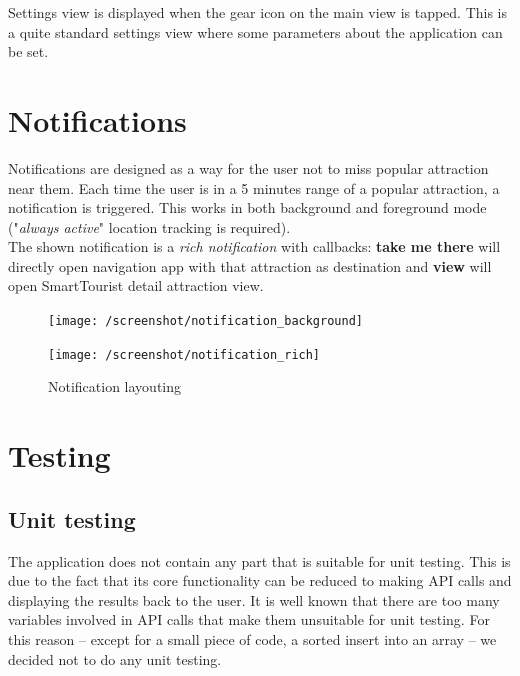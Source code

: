 \documentclass[a4paper, 11pt, parskip=half]{scrreprt}
\theoremstyle{definition}
\begin{document}
Settings view is displayed when the gear icon on the main view is tapped. This is a quite standard settings view where some parameters about the application can be set.




\chapter{Notifications}

Notifications are designed as a way for the user not to miss popular attraction near them. Each time the user is in a 5 minutes range of a popular attraction, a notification is triggered. This works in both background and foreground mode ("\textit{always active}" location tracking is required).
\\The shown notification is a \textit{rich notification} with callbacks: \textbf{take me there} will directly open navigation app with that attraction as destination and \textbf{view} will open SmartTourist detail attraction view.

\begin{figure}[H]
    \centering
	\begin{minipage}{.49\textwidth}
	\centering
  	\texttt{[image: /screenshot/notification\_background]}
  	\label{fig:test1}
	\end{minipage}
	\begin{minipage}{.49\textwidth}
  	\centering
  	\texttt{[image: /screenshot/notification\_rich]}
  	\label{fig:test2}
	\end{minipage}
	\caption{Notification layouting}
\end{figure}




\chapter{Testing}

\section{Unit testing}

The application does not contain any part that is suitable for unit testing. This is due to the fact that its core functionality can be reduced to making API calls and displaying the results back to the user. It is well known that there are too many variables involved in API calls that make them unsuitable for unit testing. For this reason -- except for a small piece of code, a sorted insert into an array -- we decided not to do any unit testing.
\end{document}
